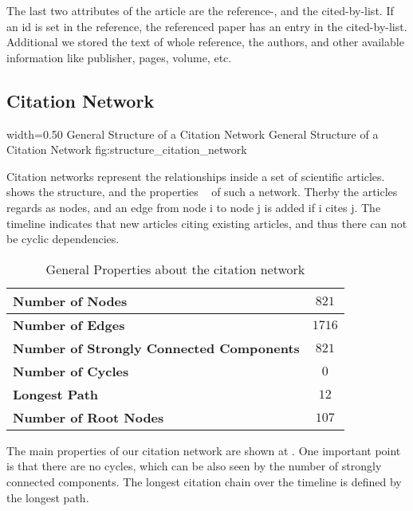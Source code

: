 The last two attributes of the article are the reference-, and the cited-by-list. If an id is set in the reference, the referenced paper has an entry in the cited-by-list. Additional we stored the text of whole reference, the authors, and other available information like publisher, pages, volume, etc.

\subsection{Citation Network}
\label{sec:citation_network}

      {width=0.50\textwidth}
      {General Structure of a Citation Network}
      {General Structure of a Citation Network}
      {fig:structure_citation_network}

Citation networks represent the relationships inside a set of scientific articles.  shows the structure, and the properties ~\cite{kas2011} of such a network. Therby the articles regards as nodes, and an edge from node i to node j is added if i cites j. The timeline indicates that new articles citing existing articles, and thus there can not be cyclic dependencies.

\begin{table}
  \centering
  \begin{tabular}{ l c }
    \toprule
    \textbf{Number of Nodes}      & $821$  \\ \midrule
    \textbf{Number of Edges}      & $1716$ \\ \midrule
    \textbf{Number of Strongly Connected Components} & $821$    \\ \midrule
    \textbf{Number of Cycles}     & $0$    \\ \midrule
    \textbf{Longest Path}         & $12$   \\ \midrule
    \textbf{Number of Root Nodes} & $107$  \\
    \bottomrule
  \end{tabular}
  \caption[General Properties about the citation network in the used dataset]{General Properties about the citation network}
  \label{tbl:general_properties_about_the_graph}
\end{table}

The main properties of our citation network are shown at . One important point is that there are no cycles, which can be also seen by the number of strongly connected components. The longest citation chain over the timeline is defined by the longest path.

